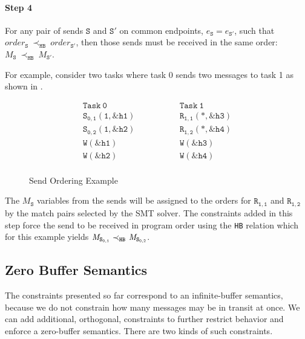 \paragraph*{Step 4} For any pair of sends $\mathtt{S}$ and
$\mathtt{S'}$ on common endpoints, $e_{\mathtt{S}}=e_{\mathtt{S'}}$,
such that
$\mathit{order}_\mathtt{S}\ \mathrm{\prec_\mathtt{HB}}\ \mathit{order}_\mathtt{S'}$,
then those sends must be received in the same order:
$M_{\mathtt{S}}\ \mathrm{\prec_{\mathtt{HB}}}\ M_{\mathtt{S'}}$.

For example, consider two tasks where task 0 sends two messages to
task 1 as shown in .

\begin{figure}[h]
\[
\begin{array}{l|l}
\;\;\;\;\;\;\;\;\mathtt{Task\ 0}\;\;\;\;\;\;\;\; & \;\;\;\;\;\;\;\; \mathtt{Task\ 1}\;\;\;\;\;\;\;\; \\
\hline
\;\;\;\;\;\;\;\;\mathtt{S_{0,1}(1,\&h1)}\;\;\;\;\;\;\;\; & \;\;\;\;\;\;\;\; \mathtt{R_{1,1}(*,\&h3)}\;\;\;\;\;\;\;\; \\
\;\;\;\;\;\;\;\;\mathtt{S_{0,2}(1,\&h2)}\;\;\;\;\;\;\;\; & \;\;\;\;\;\;\;\; \mathtt{R_{1,2}(*,\&h4)}\;\;\;\;\;\;\;\; \\
\;\;\;\;\;\;\;\;\mathtt{W(\&h1)}\;\;\;\;\;\;\;\; & \;\;\;\;\;\;\;\; \mathtt{W(\&h3)}\;\;\;\;\;\;\;\; \\
\;\;\;\;\;\;\;\;\mathtt{W(\&h2)}\;\;\;\;\;\;\;\; & \;\;\;\;\;\;\;\; \mathtt{W(\&h4)}\;\;\;\;\;\;\;\; \\
\end{array}
\]
\caption{Send Ordering Example} \label{fig:step4}
\end{figure}

The $\mathit{M_\mathtt{S}}$ variables from the sends will be assigned to the orders
for $\mathtt{R_{1,1}}$ and $\mathtt{R_{1,2}}$ by the match pairs
selected by the SMT solver. The constraints added in this step force
the send to be received in program order using the \texttt{HB}
relation which for this example yields
$\cfgnt{M}_\mathtt{S_{0,1}}\ \mathrm{\prec_\mathtt{HB}}\ \cfgnt{M}_\mathtt{S_{0,2}}$.

\subsection{Zero Buffer Semantics}

The constraints presented so far correspond to an infinite-buffer
semantics, because we do not constrain how many messages may be in
transit at once. We can add additional, orthogonal, constraints to
further restrict behavior and enforce a zero-buffer semantics. There are
two kinds of such constraints.

